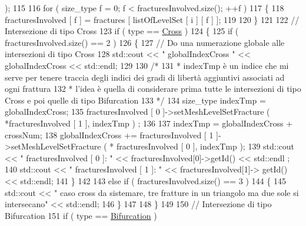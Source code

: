 \begin{DoxyCode}
      );
115            
116            \textcolor{keywordflow}{for} ( size\_type f = 0; f < fracturesInvolved.size(); ++f )
117            \{
118                 fracturesInvolved [ f ] = fractures [ listOfLevelSet [ i ] [ f ] ];
119                 
120            \}
121 
122            \textcolor{comment}{// Intersezione di tipo Cross}
123            \textcolor{keywordflow}{if} ( type == \hyperlink{classFractureIntersect_a9a4e4a784fa4c8e359767ed543f89dc5a743fef1af81c0e61412fafb9438b380e}{Cross} )
124            \{
125                \textcolor{keywordflow}{if} ( fracturesInvolved.size() == 2 )
126                 \{
127                     \textcolor{comment}{// Do una numerazione globale alle intersezioni di tipo Cross}
128                     std::cout << \textcolor{stringliteral}{" globalIndexCross "} << globalIndexCross << std::endl;
129 
130                     \textcolor{comment}{/*}
131 \textcolor{comment}{                     * indexTmp è un indice che mi serve per tenere traccia degli indici dei gradi di
       libertà aggiuntivi associati ad ogni frattura}
132 \textcolor{comment}{                     * l'idea è quella di considerare prima tutte le intersezioni di tipo Cross e poi
       quelle di tipo Bifurcation }
133 \textcolor{comment}{                     */}
134                     size\_type indexTmp = globalIndexCross;
135                     fracturesInvolved [ 0 ]->setMeshLevelSetFracture ( *fracturesInvolved [ 1 ], indexTmp )
      ;
136                     
137                     indexTmp = globalIndexCross + crossNum;
138                     globalIndexCross += fracturesInvolved [ 1 ]->setMeshLevelSetFracture ( *
      fracturesInvolved [ 0 ], indexTmp );
139                     std::cout << \textcolor{stringliteral}{" fracturesInvolved [ 0 ]: "} << fracturesInvolved[0]->getId() << std::endl
      ;
140                                         std::cout << \textcolor{stringliteral}{" fracturesInvolved [ 1 ]: "} << fracturesInvolved[1]->
      getId() << std::endl;
141                 \}
142 
143                \textcolor{keywordflow}{else} \textcolor{keywordflow}{if} ( fracturesInvolved.size() == 3 )
144                \{
145                    std::cout << \textcolor{stringliteral}{" caso cross da sistemare, tre fratture in un triangolo ma due sole si
       intersecano"} << std::endl;
146                \}
147                
148            \}
149            
150            \textcolor{comment}{// Intersezione di tipo Bifurcation}
151            \textcolor{keywordflow}{if} ( type == \hyperlink{classFractureIntersect_a9a4e4a784fa4c8e359767ed543f89dc5a4d466b3d3de0af7e18732b6f765bb1af}{Bifurcation} )

\end{DoxyCode}
